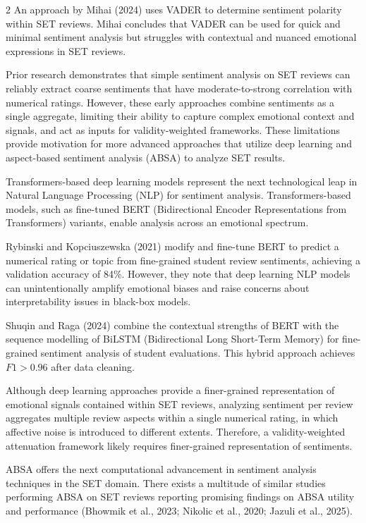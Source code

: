\documentclass{article}
\begin{document}
\begin{multicols*}{2}
An approach by Mihai (2024) uses VADER to determine sentiment polarity within SET reviews. Mihai concludes that VADER can be used for quick and minimal sentiment analysis but struggles with contextual and nuanced emotional expressions in SET reviews.
 
Prior research demonstrates that simple sentiment analysis on SET reviews can reliably extract coarse sentiments that have moderate-to-strong correlation with numerical ratings. However, these early approaches combine sentiments as a single aggregate, limiting their ability to capture complex emotional context and signals, and act as inputs for validity-weighted frameworks. These limitations provide motivation for more advanced approaches that utilize deep learning and aspect-based sentiment analysis (ABSA) to analyze SET results.

Transformers-based deep learning models represent the next technological leap in Natural Language Processing (NLP) for sentiment analysis. Transformers-based models, such as fine-tuned BERT (Bidirectional Encoder Representations from Transformers) variants, enable analysis across an emotional spectrum.

Rybinski and Kopciuszewska (2021) modify and fine-tune BERT to predict a numerical rating or topic from fine-grained student review sentiments, achieving a validation accuracy of 84\%. However, they note that deep learning NLP models can unintentionally amplify emotional biases and raise concerns about interpretability issues in black-box models.

Shuqin and Raga (2024) combine the contextual strengths of BERT with the sequence modelling of BiLSTM (Bidirectional Long Short-Term Memory) for fine-grained sentiment analysis of student evaluations. This hybrid approach achieves $F1 > 0.96$ after data cleaning. 

Although deep learning approaches provide a finer-grained representation of emotional signals contained within SET reviews, analyzing sentiment per review aggregates multiple review aspects within a single numerical rating, in which affective noise is introduced to different extents. Therefore, a validity-weighted attenuation framework likely requires finer-grained representation of sentiments. 

ABSA offers the next computational advancement in sentiment analysis techniques in the SET domain. There exists a multitude of similar studies performing ABSA on SET reviews reporting promising findings on ABSA utility and performance (Bhowmik et al., 2023; Nikolic et al., 2020; Jazuli et al., 2025).


\end{multicols*}
\end{document}
